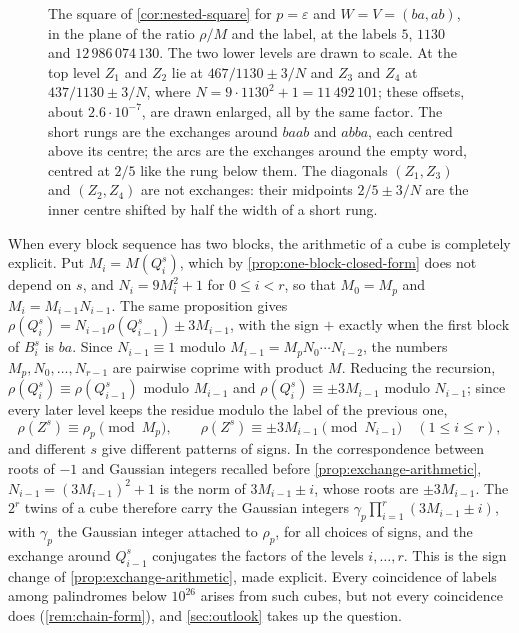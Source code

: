 \begin{figure}[htbp]
\centering

\caption{The square of \cref{cor:nested-square} for $p=\varepsilon$ and $W=V=(ba,ab)$, in the plane
of the ratio $\rho/M$ and the label, at the labels $5$, $1130$ and $12\,986\,074\,130$. The two lower
levels are drawn to scale. At the top level $Z_1$ and $Z_2$ lie at $467/1130\pm3/N$ and $Z_3$ and
$Z_4$ at $437/1130\pm3/N$, where $N=9\cdot1130^2+1=11\,492\,101$; these offsets, about
$2.6\cdot10^{-7}$, are drawn enlarged, all by the same factor. The short rungs are the exchanges
around $baab$ and $abba$, each centred above its centre; the arcs are the exchanges around the empty
word, centred at $2/5$ like the rung below them. The diagonals $(Z_1,Z_3)$ and $(Z_2,Z_4)$ are not
exchanges: their midpoints $2/5\pm3/N$ are the inner centre shifted by half the width of a short
rung.}
\label{fig:nested-square}
\end{figure}

When every block sequence has two blocks, the arithmetic of a cube is completely explicit. Put
$M_i=M(Q_i^s)$, which by \cref{prop:one-block-closed-form} does not depend on $s$, and
$N_i=9M_i^2+1$ for $0\leqslant i<r$, so that $M_0=M_p$ and $M_i=M_{i-1}N_{i-1}$. The same
proposition gives $\rho(Q_i^s)=N_{i-1}\rho(Q_{i-1}^s)\pm3M_{i-1}$, with the sign $+$ exactly when the
first block of $B_i^s$ is $ba$. Since $N_{i-1}\equiv1$ modulo $M_{i-1}=M_pN_0\cdots N_{i-2}$, the
numbers $M_p,N_0,\dots,N_{r-1}$ are pairwise coprime with product $M$. Reducing the recursion,
$\rho(Q_i^s)\equiv\rho(Q_{i-1}^s)$ modulo $M_{i-1}$ and $\rho(Q_i^s)\equiv\pm3M_{i-1}$ modulo
$N_{i-1}$; since every later level keeps the residue modulo the label of the previous one,
$$
 \rho(Z^s)\equiv\rho_p\pmod{M_p},\qquad \rho(Z^s)\equiv\pm3M_{i-1}\pmod{N_{i-1}}\quad(1\leqslant i\leqslant r),
$$
and different $s$ give different patterns of signs. In the correspondence between roots of $-1$
and Gaussian integers recalled before \cref{prop:exchange-arithmetic}, $N_{i-1}=(3M_{i-1})^2+1$ is
the norm of $3M_{i-1}\pm i$, whose roots are $\pm3M_{i-1}$. The $2^r$ twins of a cube therefore carry
the Gaussian integers $\gamma_p\prod_{i=1}^r(3M_{i-1}\pm i)$, with $\gamma_p$ the Gaussian integer
attached to $\rho_p$, for all
choices of signs, and the exchange around $Q_{i-1}^s$ conjugates the factors of the levels
$i,\dots,r$. This is the sign change of \cref{prop:exchange-arithmetic}, made explicit. Every coincidence of
labels among palindromes below $10^{26}$ arises from such cubes, but not every coincidence does
(\cref{rem:chain-form}), and \cref{sec:outlook} takes up the question.
